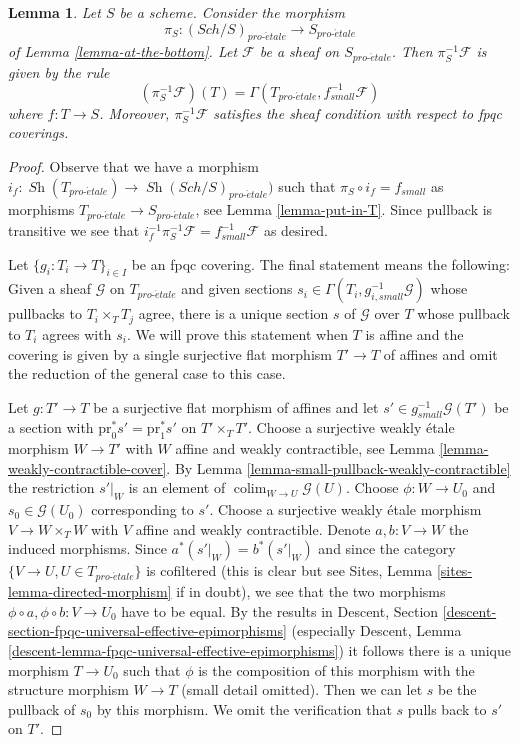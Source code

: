 \documentclass{stacks-project}
\theoremstyle{plain}
\newtheorem{lemma}[subsection]{Lemma}
\theoremstyle{definition}
\theoremstyle{remark}
\numberwithin{equation}{subsection}
\def\colim{\mathop{\mathrm{colim}}\nolimits}
\def\Sch{\mathit{Sch}}
\def\Sh{\mathop{\mathit{Sh}}\nolimits}
\def\proetale{{pro\text{-}\acute{e}tale}}
\begin{document}
\begin{lemma}
\label{lemma-describe-pullback}
Let $S$ be a scheme. Consider the morphism
$$
\pi_S : (\Sch/S)_\proetale \longrightarrow S_\proetale
$$
of Lemma \ref{lemma-at-the-bottom}. Let $\mathcal{F}$ be a sheaf on
$S_\proetale$. Then $\pi_S^{-1}\mathcal{F}$ is given by the rule
$$
(\pi_S^{-1}\mathcal{F})(T) = \Gamma(T_\proetale, f_{small}^{-1}\mathcal{F})
$$
where $f : T \to S$. Moreover, $\pi_S^{-1}\mathcal{F}$ satisfies the
sheaf condition with respect to fpqc coverings.
\end{lemma}

\begin{proof}
Observe that we have a morphism
$i_f : \Sh(T_\proetale) \to \Sh(\Sch/S)_\proetale)$
such that $\pi_S \circ i_f = f_{small}$ as morphisms
$T_\proetale \to S_\proetale$, see Lemma \ref{lemma-put-in-T}.
Since pullback is transitive we see that
$i_f^{-1} \pi_S^{-1}\mathcal{F} = f_{small}^{-1}\mathcal{F}$ as desired.

\medskip\noindent
Let $\{g_i : T_i \to T\}_{i \in I}$ be an fpqc covering. The final statement
means the following: Given a sheaf $\mathcal{G}$ on $T_\proetale$ and given
sections $s_i \in \Gamma(T_i, g_{i, small}^{-1}\mathcal{G})$ whose pullbacks
to $T_i \times_T T_j$ agree, there is a unique section $s$ of $\mathcal{G}$
over $T$ whose pullback to $T_i$ agrees with $s_i$. We will prove this
statement when $T$ is affine and the covering is given by a single
surjective flat morphism $T' \to T$ of affines and omit the reduction of
the general case to this case.

\medskip\noindent
Let $g : T' \to T$ be a surjective flat morphism of affines and let
$s' \in g_{small}^{-1}\mathcal{G}(T')$ be a section with
$\text{pr}_0^*s' = \text{pr}_1^*s'$ on $T' \times_T T'$.
Choose a surjective weakly \'etale morphism $W \to T'$ with
$W$ affine and weakly contractible, see
Lemma \ref{lemma-weakly-contractible-cover}. By
Lemma \ref{lemma-small-pullback-weakly-contractible}
the restriction $s'|_W$ is an element of $\colim_{W \to U} \mathcal{G}(U)$.
Choose $\phi : W \to U_0$ and $s_0 \in \mathcal{G}(U_0)$ corresponding to $s'$.
Choose a surjective weakly \'etale morphism $V \to W \times_T W$
with $V$ affine and weakly contractible.
Denote $a, b : V \to W$ the induced morphisms.
Since $a^*(s'|_W) = b^*(s'|_W)$ and since the category
$\{V \to U, U \in T_\proetale\}$ is cofiltered
(this is clear but see
Sites, Lemma \ref{sites-lemma-directed-morphism} if in doubt),
we see that the two morphisms $\phi \circ a , \phi \circ b : V \to U_0$
have to be equal. By the results in
Descent, Section \ref{descent-section-fpqc-universal-effective-epimorphisms}
(especially
Descent, Lemma \ref{descent-lemma-fpqc-universal-effective-epimorphisms})
it follows there is a unique morphism $T \to U_0$ such that $\phi$
is the composition of this morphism with the structure morphism $W \to T$
(small detail omitted). Then we can let $s$ be the pullback
of $s_0$ by this morphism. We omit the verification that
$s$ pulls back to $s'$ on $T'$.
\end{proof}
\end{document}
